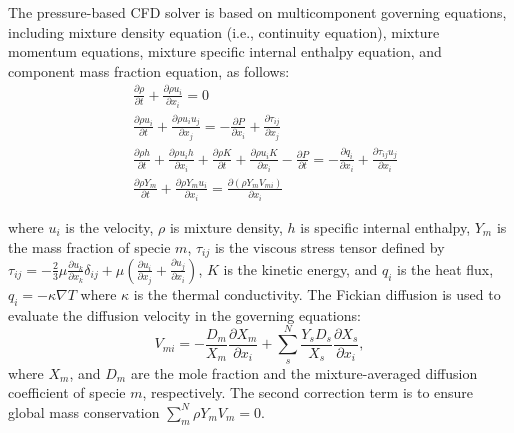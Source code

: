 The pressure-based CFD solver is based on multicomponent governing equations, including mixture density equation (i.e., continuity equation), mixture momentum equations, mixture specific internal enthalpy equation, and component mass fraction equation, as follows:
\begin{align}
     & \frac{\partial \rho}{\partial t}+\frac{\partial \rho u_i}{\partial x_i}=0 \label{G:start}      \\
     & \frac{\partial \rho u_i}{\partial t}+\frac{\partial \rho u_i u_j}{\partial x_j}=-\frac{\partial P}{\partial x_i}+\frac{\partial \tau_{ij}}{\partial x_j} \label{Gm}     \\
     & \frac{\partial \rho h}{\partial t}+\frac{\partial \rho u_i h}{\partial x_i}+\frac{\partial \rho K}{\partial t}+\frac{\partial \rho u_i K}{\partial x_i}-\frac{\partial P}{\partial t}=-\frac{\partial q_i}{\partial x_i} +\frac{\partial \tau_{ij}u_j}{\partial x_i} \\
     & \frac{\partial \rho Y_m}{\partial t}+\frac{\partial \rho Y_m u_i}{\partial x_i}=\frac{\partial\left(\rho Y_m V_{mi}\right)}{\partial x_i}  \label{G:end}
\end{align}

where $u_i$ is the velocity, $\rho$ is mixture density, $h$ is specific internal enthalpy, $Y_m$ is the mass fraction of specie $m$, $\tau_{ij}$ is the viscous stress tensor defined by $ \tau_{ij} = -\frac{2}{3}\mu\frac{\partial u_k}{\partial x_k}\delta_{ij} + \mu \left( \frac{\partial u_i}{\partial x_j} +\frac{\partial u_j}{\partial x_i}\right) $, $K$ is the kinetic energy, and $q_i$ is the heat flux, $q_i = -\kappa \nabla  T$ where $\kappa$ is the thermal conductivity. 
The Fickian diffusion is used to evaluate the diffusion velocity in the governing equations:
$$ V_{mi} = -\frac{D_m}{X_m}\frac{\partial X_m} {\partial x_i} + \sum^{N}_{s}\frac{Y_s D_s}{X_s}\frac{\partial X_s} {\partial x_i},$$
where $X_m$, and $D_m$ are the mole fraction and the mixture-averaged diffusion coefficient of specie $m$, respectively. The second correction term is to ensure global mass conservation $\sum^{N}_{m} \rho Y_m V_m = 0$.



